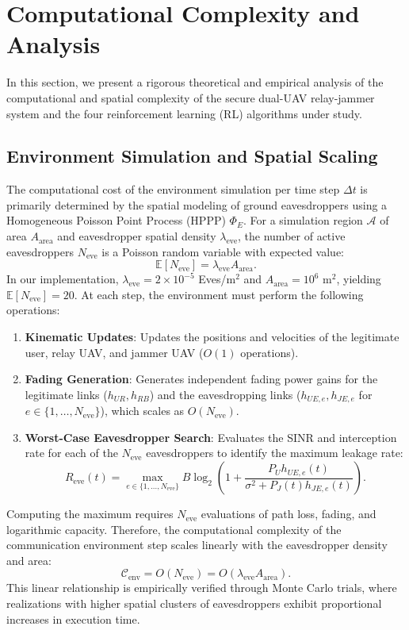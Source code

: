 \section{Computational Complexity and Analysis}

In this section, we present a rigorous theoretical and empirical analysis of the computational and spatial complexity of the secure dual-UAV relay-jammer system and the four reinforcement learning (RL) algorithms under study. 

\subsection{Environment Simulation and Spatial Scaling}
The computational cost of the environment simulation per time step $\Delta t$ is primarily determined by the spatial modeling of ground eavesdroppers using a Homogeneous Poisson Point Process (HPPP) $\Phi_E$. For a simulation region $\mathcal{A}$ of area $A_{\text{area}}$ and eavesdropper spatial density $\lambda_{\text{eve}}$, the number of active eavesdroppers $N_{\text{eve}}$ is a Poisson random variable with expected value:
\begin{equation}
    \mathbb{E}[N_{\text{eve}}] = \lambda_{\text{eve}} A_{\text{area}}.
\end{equation}
In our implementation, $\lambda_{\text{eve}} = 2 \times 10^{-5}$ Eves/m$^2$ and $A_{\text{area}} = 10^6$ m$^2$, yielding $\mathbb{E}[N_{\text{eve}}] = 20$. At each step, the environment must perform the following operations:
\begin{enumerate}
    \item \textbf{Kinematic Updates}: Updates the positions and velocities of the legitimate user, relay UAV, and jammer UAV ($O(1)$ operations).
    \item \textbf{Fading Generation}: Generates independent fading power gains for the legitimate links ($h_{UR}, h_{RB}$) and the eavesdropping links ($h_{UE,e}, h_{JE,e}$ for $e \in \{1,\dots,N_{\text{eve}}\}$), which scales as $O(N_{\text{eve}})$.
    \item \textbf{Worst-Case Eavesdropper Search}: Evaluates the SINR and interception rate for each of the $N_{\text{eve}}$ eavesdroppers to identify the maximum leakage rate:
    \begin{equation}
        R_{\text{eve}}(t) = \max_{e \in \{1, \dots, N_{\text{eve}}\}} B \log_2\left(1 + \frac{P_U h_{UE,e}(t)}{\sigma^2 + P_J(t) h_{JE,e}(t)}\right).
    \end{equation}
\end{enumerate}
Computing the maximum requires $N_{\text{eve}}$ evaluations of path loss, fading, and logarithmic capacity. Therefore, the computational complexity of the communication environment step scales linearly with the eavesdropper density and area:
\begin{equation}
    \mathcal{C}_{\text{env}} = O(N_{\text{eve}}) = O(\lambda_{\text{eve}} A_{\text{area}}).
\end{equation}
This linear relationship is empirically verified through Monte Carlo trials, where realizations with higher spatial clusters of eavesdroppers exhibit proportional increases in execution time.

